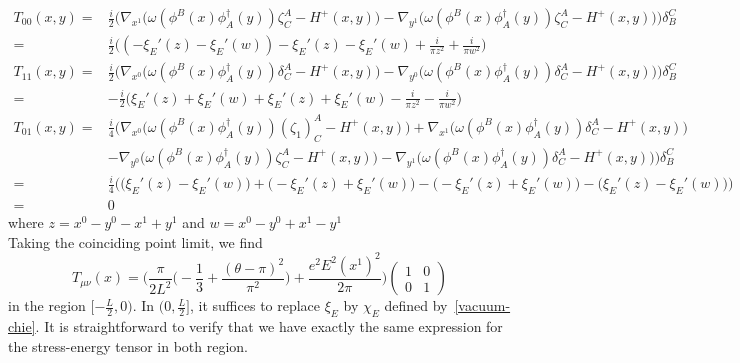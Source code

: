 \begin{equation}\label{vacuum-stressenergy}
\begin{split}
T_{00}(x,y) = 
& \frac{i}{2}\Big(\nabla_{x^1} \big( \omega(\phi^B(x) \phi^\dagger_A(y))\zeta^A_C - H^+(x,y) \big)
- \nabla_{y^1} \big( \omega( \phi^B(x) \phi^\dagger_A(y))\zeta^A_C - H^+(x,y) \big)
\Big)\delta_B^C  \\
= & \frac{i}{2} \big( (-\xi_E'(z) - \xi_E'(w)) - \xi_E'(z) - \xi_E'(w) + \frac{i}{\pi z^2} + \frac{i}{\pi w^2} \big)   \\
T_{11}(x,y) =
& \frac{i}{2}\Big(\nabla_{x^0} \big( \omega(\phi^B(x) \phi^\dagger_A(y))\delta^A_C - H^+(x,y) \big)
- \nabla_{y^0} \big( \omega( \phi^B(x) \phi^\dagger_A(y))\delta^A_C - H^+(x,y) \big)
\Big)\delta_B^C  \\
= & - \frac{i}{2}\big( \xi_E'(z) + \xi_E'(w) + \xi_E'(z) + \xi_E'(w) - \frac{i}{\pi z^2} - \frac{i}{\pi w^2}\big) \\
T_{01}(x,y) = 
& \frac{i}{4}\Big(\nabla_{x^0} \big( \omega(\phi^B(x) \phi^\dagger_A(y))(\zeta_1)^A_C - H^+(x,y) \big) + \nabla_{x^1} \big( \omega(\phi^B(x) \phi^\dagger_A(y))\delta^A_C - H^+(x,y) \big)  \\
& - \nabla_{y^0} \big( \omega( \phi^B(x) \phi^\dagger_A(y))\zeta^A_C - H^+(x,y) \big)
- \nabla_{y^1} \big( \omega( \phi^B(x) \phi^\dagger_A(y))\delta^A_C - H^+(x,y) \big)
\Big)\delta_B^C \\
= & \frac{i}{4}\Big( \big( \xi_E'(z) - \xi_E'(w) \big) + \big(- \xi_E'(z) + \xi_E'(w) \big) - \big( - \xi_E'(z) + \xi_E'(w) \big) - \big( \xi_E'(z) - \xi_E'(w) \big) \Big) \\
= & 0
\end{split}
\end{equation}
where $z = x^0 - y^0 - x^1 + y^1$ and $w = x^0 - y^0 + x^1 - y^1$ \\
Taking the coinciding point limit, we find
\begin{equation}\label{vacuum-T-with-field}
T_{\mu\nu}(x) = 
\bigg( \frac{\pi}{2L^2}\big( -\frac{1}{3} + \frac{(\theta - \pi)^2}{\pi^2}\big) + \frac{e^2E^2(x^1)^2}{2 \pi} \bigg)
\begin{pmatrix}
1 & 0 \\ 0 & 1
\end{pmatrix}
\end{equation}
in the region $[-\frac L 2, 0)$.
In $(0, \frac L 2 ]$, 
it suffices to replace $\xi_E$ by $\chi_E$ defined by~\cref{vacuum-chie}.
It is straightforward to verify that we have exactly the same expression for the stress-energy tensor in both region.
